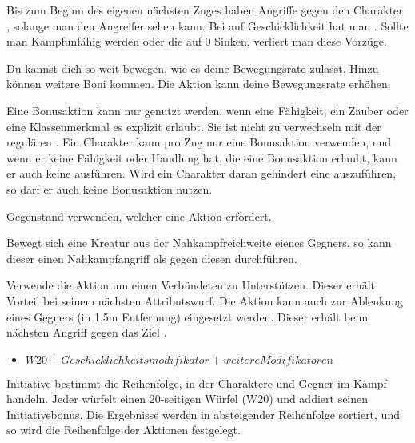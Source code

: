 Bis zum Beginn des eigenen nächsten Zuges haben Angriffe gegen den Charakter , solange man den Angreifer sehen kann. Bei  auf Geschicklichkeit hat man . Sollte man Kampfunfähig werden oder die  auf 0 Sinken, verliert man diese Vorzüge.



Du kannst dich so weit bewegen, wie es deine Bewegungsrate zulässt. Hinzu können weitere Boni kommen. Die Aktion  kann deine Bewegungsrate erhöhen.



Eine Bonusaktion kann nur genutzt werden, wenn eine Fähigkeit, ein Zauber oder eine Klassenmerkmal es explizit erlaubt. Sie ist nicht zu verwechseln mit der regulären . Ein Charakter kann pro Zug nur eine Bonusaktion verwenden, und wenn er keine Fähigkeit oder Handlung hat, die eine Bonusaktion erlaubt, kann er auch keine ausführen. Wird ein Charakter daran gehindert eine  auszuführen, so darf er auch keine Bonusaktion nutzen.



Gegenstand verwenden, welcher eine Aktion erfordert.



Bewegt sich eine Kreatur aus der Nahkampfreichweite eienes Gegners, so kann dieser einen Nahkampfangriff als  gegen diesen durchführen.



Verwende die Aktion um einen Verbündeten zu Unterstützen. Dieser erhält Vorteil bei seinem nächsten Attributswurf. Die Aktion kann auch zur Ablenkung eines Gegners (in 1,5m Entfernung) eingesetzt werden. Dieser erhält beim nächsten Angriff gegen das Ziel .



\begin{itemize}
\item $W20 + Geschicklichkeitsmodifikator + weitere Modifikatoren$
\end{itemize}

Initiative bestimmt die Reihenfolge, in der Charaktere und Gegner im Kampf handeln. Jeder würfelt einen 20-seitigen Würfel (W20) und addiert seinen Initiativebonus. Die Ergebnisse werden in absteigender Reihenfolge sortiert, und so wird die Reihenfolge der Aktionen festgelegt.

